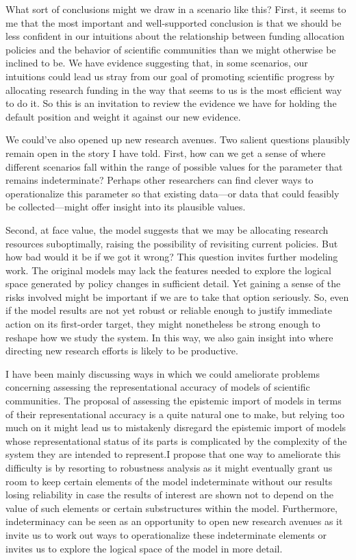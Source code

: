\documentclass{article}
\begin{document}
What sort of conclusions might we draw in a scenario like this? First, it seems to me that the most important and well-supported conclusion is that we should be less confident in our intuitions about the relationship between funding allocation policies and the behavior of scientific communities than we might otherwise be inclined to be. We have evidence suggesting that, in some scenarios, our intuitions could lead us stray from our goal of promoting scientific progress by allocating research funding in the way that seems to us is the most efficient way to do it. So this is an invitation to review the evidence we have for holding the default position and weight it against our new evidence.

We could've also opened up new research avenues. Two salient questions plausibly remain open in the story I have told. First, how can we get a sense of where different scenarios fall within the range of possible values for the parameter that remains indeterminate? Perhaps other researchers can find clever ways to operationalize this parameter so that existing data—or data that could feasibly be collected—might offer insight into its plausible values.

Second, at face value, the model suggests that we may be allocating research resources suboptimally, raising the possibility of revisiting current policies. But how bad would it be if we got it wrong? This question invites further modeling work. The original models may lack the features needed to explore the logical space generated by policy changes in sufficient detail. Yet gaining a sense of the risks involved might be important if we are to take that option seriously. So, even if the model results are not yet robust or reliable enough to justify immediate action on its first-order target, they might nonetheless be strong enough to reshape how we study the system. In this way, we also gain insight into where directing new research efforts is likely to be productive.

I have been mainly discussing ways in which we could ameliorate problems concerning assessing the representational accuracy of models of scientific communities. The proposal of assessing the epistemic import of models in terms of their representational accuracy is a quite natural one to make, but relying too much on it might lead us to mistakenly disregard the epistemic import of models whose representational status of its parts is complicated by the complexity of the system they are intended to represent.I propose that one way to ameliorate this difficulty is by resorting to robustness analysis as it might eventually grant us room to keep certain elements of the model indeterminate without our results losing reliability in case the results of interest are shown not to depend on the value of such elements or certain substructures within the model. Furthermore, indeterminacy can be seen as an opportunity to open new research avenues as it invite us to work out ways to operationalize these indeterminate elements or invites us to explore the logical space of the model in more detail. 
\end{document}
